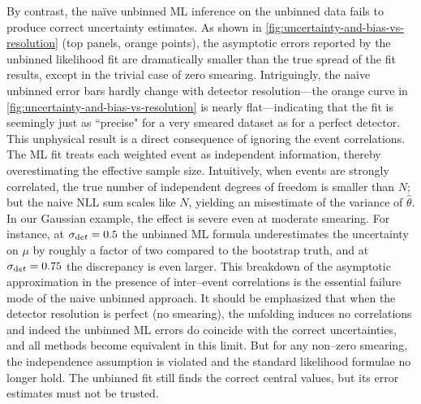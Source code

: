             By contrast, the naïve unbinned ML inference on the unbinned data fails to produce correct uncertainty estimates.
            As shown in \cref{fig:uncertainty-and-bias-vs-resolution} (top panels, orange points), the asymptotic errors reported by the unbinned likelihood fit are dramatically smaller than the true spread of the fit results, except in the trivial case of zero smearing.
            Intriguingly, the naive unbinned error bars hardly change with detector resolution---the orange curve in \cref{fig:uncertainty-and-bias-vs-resolution} is nearly flat---indicating that the fit is seemingly just as ``precise" for a very smeared dataset as for a perfect detector.
            This unphysical result is a direct consequence of ignoring the event correlations.
            The ML fit treats each weighted event as independent information, thereby overestimating the effective sample size.
            Intuitively, when events are strongly correlated, the true number of independent degrees of freedom is smaller than $N$; but the naive NLL sum scales like $N$, yielding an misestimate of the variance of $\hat\theta$.
            In our Gaussian example, the effect is severe even at moderate smearing.
            For instance, at $\sigma_{\text det}=0.5$ the unbinned ML formula underestimates the uncertainty on $\mu$ by roughly a factor of two compared to the bootstrap truth, and at $\sigma_{\text det}=0.75$ the discrepancy is even larger.
            This breakdown of the asymptotic approximation in the presence of inter--event correlations is the essential failure mode of the naive unbinned approach.
            It should be emphasized that when the detector resolution is perfect (no smearing), the unfolding induces no correlations and indeed the unbinned ML errors do coincide with the correct uncertainties, and all methods become equivalent in this limit.
            But for any non--zero smearing, the independence assumption is violated and the standard likelihood formulae no longer hold.
            The unbinned fit still finds the correct central values, but its error estimates must not be trusted.
    
